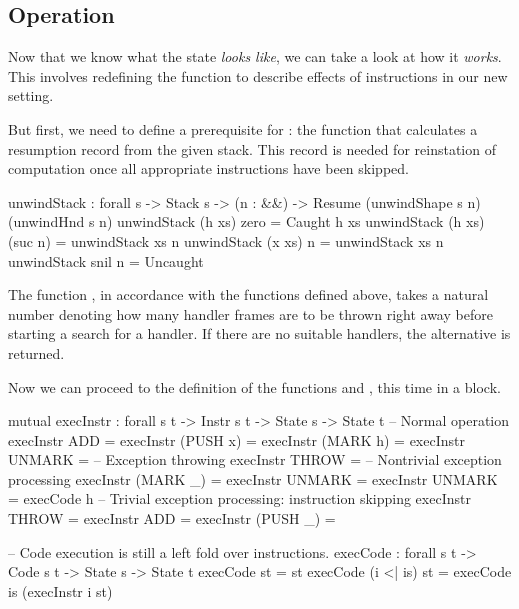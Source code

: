 \subsection{Operation}

Now that we know what the state \emph{looks like}, we can take a look at how it \emph{works}.
This involves redefining the function  to describe effects of instructions
in our new setting.

But first, we need to define a prerequisite for : the function
 that calculates a resumption record from the given stack. This record
is needed for reinstation of computation once all appropriate instructions have been skipped.

\label{sec:ham-unwindStack}\begin{code}
  unwindStack : forall {s} -> Stack s -> (n : \bN&\!&)
    -> Resume (unwindShape s n) (unwindHnd s n)
  unwindStack (h \sconsh xs) zero = Caught h xs
  unwindStack (h \sconsh xs) (suc n) = unwindStack xs n
  unwindStack (x \scons xs) n = unwindStack xs n
  unwindStack snil n = Uncaught
\end{code}

\noindent The function , in accordance with the functions
defined above, takes a natural number  denoting how many handler
frames are to be thrown right away before starting a search for a handler.  If
there are no suitable handlers, the alternative  is returned.

Now we can proceed to the definition of the functions  and
, this time in a  block.

\begin{codei}
  mutual
    execInstr : forall {s t} -> Instr s t -> State s -> State t
  	-- Normal operation
    execInstr ADD 				= \tick[ (x + y) \scons st ]
    execInstr (PUSH x)		\tick[ st ] 		= \tick[ x \scons st ]
    execInstr (MARK h)		\tick[ st ] 		= \tick[ h \sconsh st ]
    execInstr UNMARK			= \tick[ x \scons st ]
    -- Exception throwing  
    execInstr THROW			\tick[ st ] =  
    -- Nontrivial exception processing
    execInstr (MARK _)		\x[ n	 ,	r	] = \x[ suc n, r ]
    execInstr UNMARK		\x[ suc n ,	r	] = \x[ n	, r ]
    execInstr UNMARK		 = execCode h \tick[ st ]
    -- Trivial exception processing: instruction skipping
    execInstr THROW			\x[ n , r ] = \x[ n , r ]
    execInstr ADD			\x[ n , r ] = \x[ n , r ]
    execInstr (PUSH _)		\x[ n , r ] = \x[ n , r ]
\end{codei}
\begin{code}
    -- Code execution is still a left fold over instructions.
    execCode : forall {s t} -> Code s t -> State s -> State t
    execCode \nil st = st
    execCode (i <| is) st = execCode is (execInstr i st)
\end{code}

